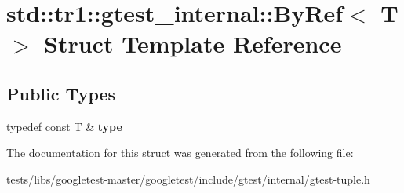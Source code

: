 \hypertarget{structstd_1_1tr1_1_1gtest__internal_1_1ByRef}{}\section{std\+:\+:tr1\+:\+:gtest\+\_\+internal\+:\+:By\+Ref$<$ T $>$ Struct Template Reference}
\label{structstd_1_1tr1_1_1gtest__internal_1_1ByRef}
\subsection*{Public Types}
\begin{DoxyCompactItemize}
\item 
\mbox{\label{structstd_1_1tr1_1_1gtest__internal_1_1ByRef_ac42ad942ee1cfa86b2abcce9b88ac10e}} 
typedef const T \& {\bfseries type}
\end{DoxyCompactItemize}


The documentation for this struct was generated from the following file\+:\begin{DoxyCompactItemize}
\item 
tests/libs/googletest-\/master/googletest/include/gtest/internal/gtest-\/tuple.\+h\end{DoxyCompactItemize}
